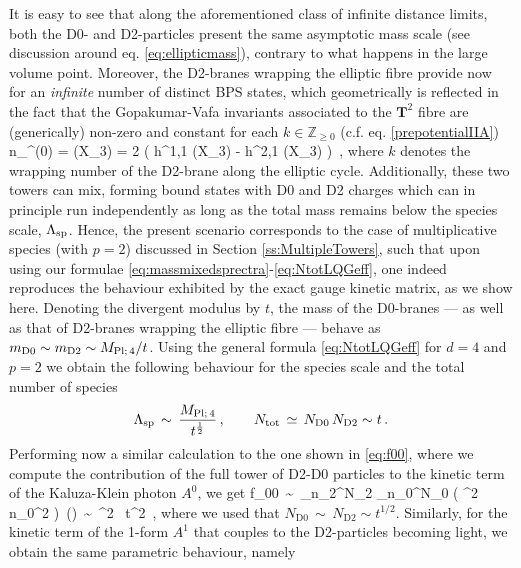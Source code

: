 It is easy to see that along the aforementioned class of infinite distance limits, both the D0- and D2-particles present the same asymptotic mass scale (see discussion around eq. \eqref{eq:ellipticmass}), contrary to what happens in the large volume point. Moreover, the D2-branes wrapping the elliptic fibre provide now for an \emph{infinite} number of distinct BPS states, which geometrically is reflected in the fact that the Gopakumar-Vafa invariants associated to the $\mathbf{T}^2$ fibre are (generically) non-zero and constant\cite{Klemm:2012sx, Klemm:1996hh} for each $k\in \mathbb{Z}_{\geq 0}$ (c.f. eq. \eqref{prepotentialIIA})
%
\beq
		n_{}^{(0)} = \chi(X_3) = 2 \left ( h^{1,1} (X_3) -  h^{2,1} (X_3) \right)\, ,
\eeq
where $k$ denotes the wrapping number of the D2-brane along the elliptic cycle. Additionally, these two towers can mix, forming bound states with D0 and D2 charges which can in principle run independently as long as the total mass remains below the species scale, $\Lambda_{\text{sp}}$. Hence, the present scenario corresponds to the case of multiplicative species (with $p=2$) discussed in Section \ref{ss:MultipleTowers}, such that upon using our formulae \eqref{eq:massmixedsprectra}-\eqref{eq:NtotLQGeff}, one indeed reproduces the behaviour exhibited by the exact gauge kinetic matrix, as we show here. Denoting the divergent modulus by $t$, the mass of the D0-branes --- as well as that of D2-branes wrapping the elliptic fibre --- behave as $m_{\text{D}0}\sim m_{\text{D}2}\sim M_{\text{Pl;}\, 4}/t$. Using the general formula \eqref{eq:NtotLQGeff} for $d=4$ and $p=2$ we obtain the following behaviour for the species scale and the total number of species
%
\begin{equation}
    \Lambda_{\text{sp}}\, \sim\,  \dfrac{M_{\text{Pl;}\, 4}}{t^{\frac{1}{2}}}\, , \qquad N_{\text{tot}}\, \simeq \, N_{\mathrm{D}0}\,  N_{\mathrm{D}2} \sim t\, .
\end{equation}
%
Performing now a similar calculation to the one shown in \eqref{eq:f00}, where we compute the contribution of the full tower of D2-D0 particles to the kinetic term of the Kaluza-Klein photon $A^0$, we get
%
\beq \label{eq:f00F-theorylimit}
		f_{00}\, \sim\, \sum_{n_{2}}^{N_{2}} \sum_{n_{0}}^{N_{0}}  \left(  \Mpf^2\,  n_{0}^2 \right)\, \log \left(\right)\, \sim \,  \Mpf^2 \, t^2\,  ,
\eeq
%
where we used that $N_{\mathrm{D}0} \, \sim \, N_{\mathrm{D}2} \sim t^{1/2}$. Similarly, for the kinetic term of the 1-form $A^1$ that couples to the D2-particles becoming light, we obtain the same parametric behaviour, namely
